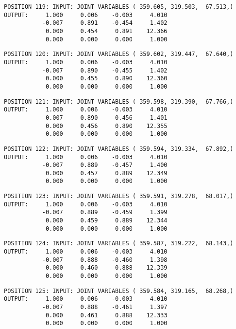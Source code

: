 \begin{verbatim}
POSITION 119: INPUT: JOINT VARIABLES ( 359.605, 319.503,  67.513,)
OUTPUT:     1.000     0.006    -0.003     4.010
           -0.007     0.891    -0.454     1.402
            0.000     0.454     0.891    12.366
            0.000     0.000     0.000     1.000
\end{verbatim} \pagebreak[1]\begin{verbatim}
POSITION 120: INPUT: JOINT VARIABLES ( 359.602, 319.447,  67.640,)
OUTPUT:     1.000     0.006    -0.003     4.010
           -0.007     0.890    -0.455     1.402
            0.000     0.455     0.890    12.360
            0.000     0.000     0.000     1.000
\end{verbatim} \pagebreak[1]\begin{verbatim}
POSITION 121: INPUT: JOINT VARIABLES ( 359.598, 319.390,  67.766,)
OUTPUT:     1.000     0.006    -0.003     4.010
           -0.007     0.890    -0.456     1.401
            0.000     0.456     0.890    12.355
            0.000     0.000     0.000     1.000
\end{verbatim} \pagebreak[1]\begin{verbatim}
POSITION 122: INPUT: JOINT VARIABLES ( 359.594, 319.334,  67.892,)
OUTPUT:     1.000     0.006    -0.003     4.010
           -0.007     0.889    -0.457     1.400
            0.000     0.457     0.889    12.349
            0.000     0.000     0.000     1.000
\end{verbatim} \pagebreak[1]\begin{verbatim}
POSITION 123: INPUT: JOINT VARIABLES ( 359.591, 319.278,  68.017,)
OUTPUT:     1.000     0.006    -0.003     4.010
           -0.007     0.889    -0.459     1.399
            0.000     0.459     0.889    12.344
            0.000     0.000     0.000     1.000
\end{verbatim} \pagebreak[1]\begin{verbatim}
POSITION 124: INPUT: JOINT VARIABLES ( 359.587, 319.222,  68.143,)
OUTPUT:     1.000     0.006    -0.003     4.010
           -0.007     0.888    -0.460     1.398
            0.000     0.460     0.888    12.339
            0.000     0.000     0.000     1.000
\end{verbatim} \pagebreak[1]\begin{verbatim}
POSITION 125: INPUT: JOINT VARIABLES ( 359.584, 319.165,  68.268,)
OUTPUT:     1.000     0.006    -0.003     4.010
           -0.007     0.888    -0.461     1.397
            0.000     0.461     0.888    12.333
            0.000     0.000     0.000     1.000
\end{verbatim} \pagebreak[1]\begin{verbatim}

\end{verbatim}
